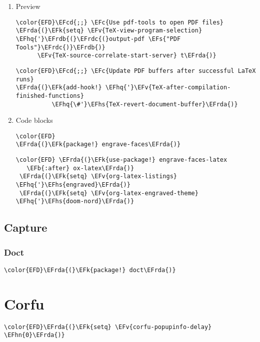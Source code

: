 \documentclass[12pt]{article}
\theoremstyle{plain}%
\theoremstyle{definition}
\theoremstyle{remark}
\newcommand{\EFc}[1]{\textcolor{EFc}{#1}} %
\newcommand{\EFcd}[1]{\textcolor{EFcd}{#1}} %
\newcommand{\EFs}[1]{\textcolor{EFs}{#1}} %
\newcommand{\EFk}[1]{\textcolor{EFk}{#1}} %
\newcommand{\EFb}[1]{\textcolor{EFb}{#1}} %
\newcommand{\EFv}[1]{\textcolor{EFv}{#1}} %
\newcommand{\EFhn}[1]{\textcolor{EFhn}{\textbf{#1}}} %
\newcommand{\EFhq}[1]{\textcolor{EFhq}{#1}} %
\newcommand{\EFhs}[1]{\textcolor{EFhs}{#1}} %
\newcommand{\EFrda}[1]{\textcolor{EFrda}{#1}} %
\newcommand{\EFrdb}[1]{\textcolor{EFrdb}{#1}} %
\newcommand{\EFrdc}[1]{\textcolor{EFrdc}{#1}} %
\begin{document}
\begin{enumerate}
\item Preview
\label{sec:orga806a09}
\begin{Code}
\begin{Verbatim}
\color{EFD}\EFcd{;;} \EFc{Use pdf-tools to open PDF files}
\EFrda{(}\EFk{setq} \EFv{TeX-view-program-selection} \EFhq{'}\EFrdb{(}\EFrdc{(}output-pdf \EFs{"PDF Tools"}\EFrdc{)}\EFrdb{)}
      \EFv{TeX-source-correlate-start-server} t\EFrda{)}
\end{Verbatim}
\end{Code}
\begin{Code}
\begin{Verbatim}
\color{EFD}\EFcd{;;} \EFc{Update PDF buffers after successful LaTeX runs}
\EFrda{(}\EFk{add-hook!} \EFhq{'}\EFv{TeX-after-compilation-finished-functions}
          \EFhq{\#'}\EFhs{TeX-revert-document-buffer}\EFrda{)}
\end{Verbatim}
\end{Code}
\item Code blocks
\label{sec:org340b8df}
\begin{Code}
\begin{Verbatim}
\color{EFD}
\EFrda{(}\EFk{package!} engrave-faces\EFrda{)}
\end{Verbatim}
\end{Code}
\begin{Code}
\begin{Verbatim}
\color{EFD} \EFrda{(}\EFk{use-package!} engrave-faces-latex
   \EFb{:after} ox-latex\EFrda{)}
 \EFrda{(}\EFk{setq} \EFv{org-latex-listings} \EFhq{'}\EFhs{engraved}\EFrda{)}
 \EFrda{(}\EFk{setq} \EFv{org-latex-engraved-theme} \EFhq{'}\EFhs{doom-nord}\EFrda{)}
\end{Verbatim}
\end{Code}
\end{enumerate}
\subsection{Capture}
\label{sec:org9b5fcce}
\subsubsection{Doct}
\label{sec:org797b7cb}
\begin{Code}
\begin{Verbatim}
\color{EFD}\EFrda{(}\EFk{package!} doct\EFrda{)}
\end{Verbatim}
\end{Code}
\section{Corfu}
\label{sec:orgf19746f}
\begin{Code}
\begin{Verbatim}
\color{EFD}\EFrda{(}\EFk{setq} \EFv{corfu-popupinfo-delay} \EFhn{0}\EFrda{)}
\end{Verbatim}
\end{Code}
\end{document}
